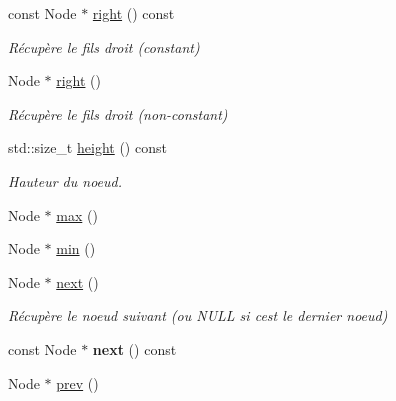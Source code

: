 \begin{DoxyCompactItemize}
\mbox{\label{classBSTreeNode_a791628dcbe4d70541227882b42592d1f}} 
const Node $\ast$ \hyperlink{classBSTreeNode_a791628dcbe4d70541227882b42592d1f}{right} () const
\begin{DoxyCompactList}\small\item\em Récupère le fils droit (constant) \end{DoxyCompactList}\item 
\mbox{\label{classBSTreeNode_aa4f11b0043d113545c1a407a844939ee}} 
Node $\ast$ \hyperlink{classBSTreeNode_aa4f11b0043d113545c1a407a844939ee}{right} ()
\begin{DoxyCompactList}\small\item\em Récupère le fils droit (non-\/constant) \end{DoxyCompactList}\item 
\mbox{\label{classBSTreeNode_aea220a44e4c4f9a835d03d75b6851a56}} 
std\+::size\+\_\+t \hyperlink{classBSTreeNode_aea220a44e4c4f9a835d03d75b6851a56}{height} () const
\begin{DoxyCompactList}\small\item\em Hauteur du noeud. \end{DoxyCompactList}\item 
Node $\ast$ \hyperlink{classBSTreeNode_aa2bc109220f6782ad1f9fbb80b7dca60}{max} ()
\item 
Node $\ast$ \hyperlink{classBSTreeNode_a02645620a3cb4ab4f9d15b1207422cb3}{min} ()
\item 
\mbox{\label{classBSTreeNode_a2a4500849e93739a886fa6dd011fff4b}} 
Node $\ast$ \hyperlink{classBSTreeNode_a2a4500849e93739a886fa6dd011fff4b}{next} ()
\begin{DoxyCompactList}\small\item\em Récupère le noeud suivant (ou N\+U\+LL si c\textquotesingle{}est le dernier noeud) \end{DoxyCompactList}\item 
\mbox{\label{classBSTreeNode_ad9cb1ab6bc14396ce1ed8405fb996352}} 
const Node $\ast$ {\bfseries next} () const
\item 
\mbox{\label{classBSTreeNode_a6a51620ecd4f94569c128d3d2f7608cc}} 
Node $\ast$ \hyperlink{classBSTreeNode_a6a51620ecd4f94569c128d3d2f7608cc}{prev} ()

\end{DoxyCompactItemize}
